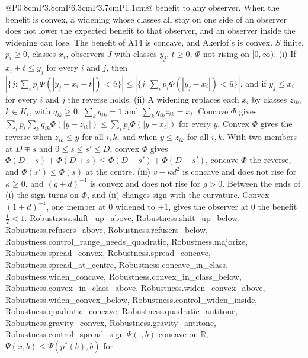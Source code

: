 \begin{longtable}{@{}P{0.8cm}P{3.8cm}P{6.3cm}P{3.7cm}P{1.1cm}@{}}
{  benefit to any observer. When the benefit is convex, a widening whose
  classes all stay on one side of an observer does not lower the expected
  benefit to that observer, and an observer inside the widening can lose.
  The benefit of A14 is concave, and Akerlof's is convex.}
  {$S$ finite, $p_i\ge0$, classes $x_i$, observers $J$ with classes $y_j$,
  $t\ge0$, $\Phi$ not rising on $[0,\infty)$.
  (i) If $x_i+t\le y_j$ for every $i$ and $j$, then
  $|\{j:\sum_ip_i\Phi(|y_j-x_i-t|)<\bar u\}|\le|\{j:\sum_ip_i\Phi(|y_j-x_i|)<\bar u\}|$,
  and if $y_j\le x_i$ for every $i$ and $j$ the reverse holds.
  (ii) A widening replaces each $x_i$ by classes $z_{ik}$, $k\in K_i$, with
  $q_{ik}\ge0$, $\sum_kq_{ik}=1$ and $\sum_kq_{ik}z_{ik}=x_i$. Concave
  $\Phi$ gives $\sum_ip_i\sum_kq_{ik}\Phi(|y-z_{ik}|)\le\sum_ip_i\Phi(|y-x_i|)$
  for every $y$. Convex $\Phi$ gives the reverse when $z_{ik}\le y$ for all
  $i,k$, and when $y\le z_{ik}$ for all $i,k$. With two members at $D\mp s$
  and $0\le s\le s'\le D$, convex $\Phi$ gives
  $\Phi(D-s)+\Phi(D+s)\le\Phi(D-s')+\Phi(D+s')$, concave $\Phi$ the reverse,
  and $\Phi(s')\le\Phi(s)$ at the centre.
  (iii) $v-\kappa d^2$ is concave and does not rise for $\kappa\ge0$, and
  $(g+d)^{-1}$ is convex and does not rise for $g>0$.
  Between the ends of (i) the sign turns on $\Phi$, and (ii) changes sign
  with the curvature. Convex $(1+d)^{-1}$, one member at $0$ widened to
  $\pm1$, gives the observer at $0$ the benefit $\tfrac12<1$.}
  {Robustness.shift_up_above, Robustness.shift_up_below, Robustness.refusers_above, Robustness.refusers_below, Robustness.control_range_needs_quadratic, Robustness.majorize, Robustness.spread_convex, Robustness.spread_concave, Robustness.spread_at_centre, Robustness.concave_in_class, Robustness.widen_concave, Robustness.convex_in_class_below, Robustness.convex_in_class_above, Robustness.widen_convex_above, Robustness.widen_convex_below, Robustness.control_widen_inside, Robustness.quadratic_concave, Robustness.quadratic_antitone, Robustness.gravity_convex, Robustness.gravity_antitone, Robustness.control_spread_sign}
  {$\Psi(\cdot,b)$ concave on $\mathbb R$, $\Psi(x,b)\le\Psi(p^*(b),b)$ for
}
\end{longtable}
